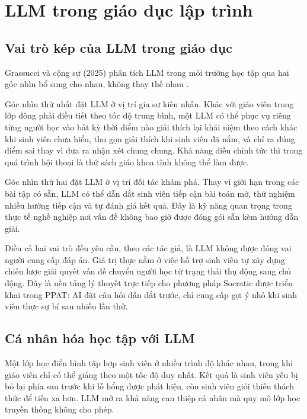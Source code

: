 \documentclass[../main.tex]{subfiles}
\begin{document}
\section{LLM trong giáo dục lập trình}

\subsection{Vai trò kép của LLM trong giáo dục}

Grassucci và cộng sự (2025) phân tích LLM trong môi trường học tập qua hai góc nhìn bổ sung cho nhau, không thay thế nhau \cite{grassucci2026beyond}.

Góc nhìn thứ nhất đặt LLM ở vị trí gia sư kiên nhẫn. Khác với giáo viên trong lớp đông phải điều tiết theo tốc độ trung bình, một LLM có thể phục vụ riêng từng người học vào bất kỳ thời điểm nào giải thích lại khái niệm theo cách khác khi sinh viên chưa hiểu, thu gọn giải thích khi sinh viên đã nắm, và chỉ ra đúng điểm sai thay vì đưa ra nhận xét chung chung. Khả năng điều chỉnh tức thì trong quá trình hội thoại là thứ sách giáo khoa tĩnh không thể làm được.

Góc nhìn thứ hai đặt LLM ở vị trí đối tác khám phá. Thay vì giới hạn trong các bài tập có sẵn, LLM có thể dẫn dắt sinh viên tiếp cận bài toán mở, thử nghiệm nhiều hướng tiếp cận và tự đánh giá kết quả. Đây là kỹ năng quan trọng trong thực tế nghề nghiệp nơi vấn đề không bao giờ được đóng gói sẵn kèm hướng dẫn giải.

Điều cả hai vai trò đều yêu cầu, theo các tác giả, là LLM không được đóng vai người cung cấp đáp án. Giá trị thực nằm ở việc hỗ trợ sinh viên tự xây dựng chiến lược giải quyết vấn đề chuyển người học từ trạng thái thụ động sang chủ động. Đây là nền tảng lý thuyết trực tiếp cho phương pháp Socratic được triển khai trong PPAT: AI đặt câu hỏi dẫn dắt trước, chỉ cung cấp gợi ý nhỏ khi sinh viên thực sự bí sau nhiều lần thử.

\subsection{Cá nhân hóa học tập với LLM}

Một lớp học điển hình tập hợp sinh viên ở nhiều trình độ khác nhau, trong khi giáo viên chỉ có thể giảng theo một tốc độ duy nhất. Kết quả là sinh viên yếu bị bỏ lại phía sau trước khi lỗ hổng được phát hiện, còn sinh viên giỏi thiếu thách thức để tiến xa hơn. LLM mở ra khả năng can thiệp cá nhân mà quy mô lớp học truyền thống không cho phép.
\end{document}
